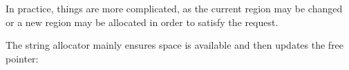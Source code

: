 \noindent
In practice, things are more complicated, as the current region may be
changed or a new region may be allocated in order to satisfy the
request.


The string allocator mainly ensures space is available and then
updates the free pointer:

\goodbreak
